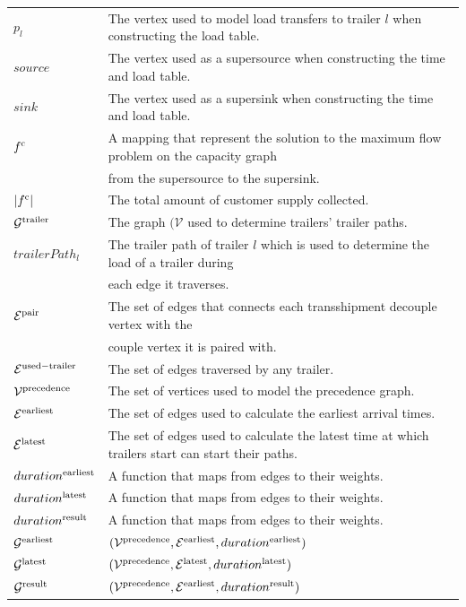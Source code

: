 \begin{longtable}{ll}
$p_l$ & The vertex used to model load transfers to trailer $l$ when constructing the load table. \\
$source $ & The vertex used as a supersource when constructing the time and load table. \\
$sink $ & The vertex used as a supersink when constructing the time and load table. \\
$f^{\rm c} $ & A mapping that represent the solution to the maximum flow problem on the capacity graph \\
& from the supersource to the supersink.   \\
$|f^{\rm c}| $ & The total amount of customer supply collected. \\
$\mathcal G^{\rm trailer}$ & The graph $(\mathcal V$ used to determine trailers' trailer paths. \\
$trailerPath_l$ & The trailer path of trailer $l$ which is used to determine the load of a trailer during \\
& each edge it traverses. \\
$\mathcal E^{\rm pair}$  & The set of edges that connects each transshipment decouple vertex with the \\
& couple  vertex it is paired with.  \\
$\mathcal E^{\rm used-trailer}$  & The set of edges traversed by any trailer.  \\
$\mathcal V^{\rm precedence}$ & The set of vertices used to model the precedence graph. \\
$\mathcal E^{\rm earliest}$ & The set of edges used to calculate the earliest arrival times. \\
$\mathcal E^{\rm latest}$ & The set of edges used to calculate the latest time at which trailers start can start their paths.  \\
$duration^{\rm earliest}$ & A function that maps from edges to their weights. \\
$duration^{\rm latest}$ & A function that maps from edges to their weights. \\
$duration^{\rm result}$ & A function that maps from edges to their weights. \\
$\mathcal G^{\rm earliest}$ & $(\mathcal V^{\rm precedence},\mathcal E^{\rm earliest},duration^{\rm earliest} )$ \\
$\mathcal G^{\rm latest}$ & $(\mathcal V^{\rm precedence},\mathcal E^{\rm latest},duration^{\rm latest} )$ \\
$\mathcal G^{\rm result}$ & $(\mathcal V^{\rm precedence},\mathcal E^{\rm earliest},duration^{\rm result} )$ \\

\end{longtable}
